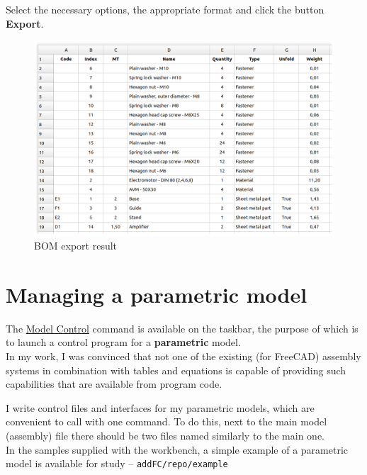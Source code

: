 \documentclass[a4paper,12pt]{article}
\begin{document}
\pagebreak

Select the necessary options, the appropriate format and click the button \textbf{Export}.

\begin{figure}[htp]
	\centering
	\includegraphics[width=1\textwidth]{img/specification_result.png}
	\caption{BOM export result}
	\label{sec:specification_result}
\end{figure}

\pagebreak




\section{Managing a parametric model}

The \hyperref[sec:3]{Model Control} command is available on the taskbar, the purpose of which is to launch a control program for a \textbf{parametric} model.\\

In my work, I was convinced that not one of the existing (for FreeCAD) assembly systems in combination with tables and equations is capable of providing such capabilities that are available from program code.

I write control files and interfaces for my parametric models, which are convenient to call with one command. To do this, next to the main model (assembly) file there should be two files named similarly to the main one.\\

In the samples supplied with the workbench, a simple example of a parametric model is available for study -- \verb|addFC/repo/example|
\end{document}

